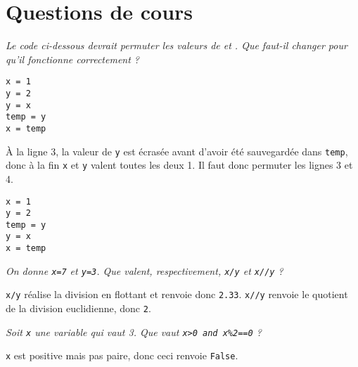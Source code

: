 \section{Questions de cours}
\begin{Exercise}\it
Le code ci-dessous devrait permuter les valeurs de  et . Que faut-il changer pour qu’il fonctionne correctement ?
\begin{lstlisting}
x = 1
y = 2
y = x
temp = y
x = temp
\end{lstlisting}
\end{Exercise}
\begin{Answer}
À la ligne 3, la valeur de \lstinline|y| est écrasée avant d'avoir été sauvegardée dans \lstinline|temp|, donc à la fin \lstinline|x| et \lstinline|y| valent toutes les deux 1. Il faut donc permuter les lignes 3 et 4.
\begin{lstlisting}
x = 1
y = 2
temp = y
y = x
x = temp
\end{lstlisting}
\end{Answer}
\begin{Exercise}\it
On donne \lstinline|x=7| et \lstinline|y=3|. Que valent, respectivement, \lstinline|x/y| et \lstinline|x//y| ?
\end{Exercise}
\begin{Answer}
\lstinline|x/y| réalise la division en flottant et renvoie donc \lstinline|2.33|. \lstinline|x//y| renvoie le quotient de la division euclidienne, donc \lstinline|2|.
\end{Answer}
\begin{Exercise}\it
Soit \lstinline|x| une variable qui vaut 3. Que vaut \lstinline|x>0 and x%2==0| ?
\end{Exercise}
\begin{Answer}
\lstinline|x| est positive mais pas paire, donc ceci renvoie \lstinline|False|.
\end{Answer}

